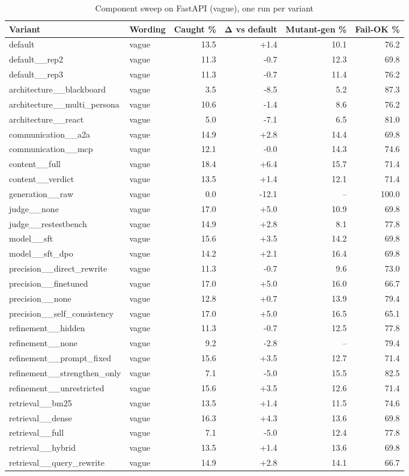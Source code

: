 \begin{table}[t]\centering\small
\caption{Component sweep on FastAPI (vague), one run per variant}
\begin{tabular}{llrrrr}
\toprule
Variant & Wording & Caught \% & Δ vs default & Mutant-gen \% & Fail-OK \% \\
\midrule
default & vague & 13.5 & +1.4 & 10.1 & 76.2 \\
default\_\_rep2 & vague & 11.3 & -0.7 & 12.3 & 69.8 \\
default\_\_rep3 & vague & 11.3 & -0.7 & 11.4 & 76.2 \\
architecture\_\_blackboard & vague & 3.5 & -8.5 & 5.2 & 87.3 \\
architecture\_\_multi\_persona & vague & 10.6 & -1.4 & 8.6 & 76.2 \\
architecture\_\_react & vague & 5.0 & -7.1 & 6.5 & 81.0 \\
communication\_\_a2a & vague & 14.9 & +2.8 & 14.4 & 69.8 \\
communication\_\_mcp & vague & 12.1 & -0.0 & 14.3 & 74.6 \\
content\_\_full & vague & 18.4 & +6.4 & 15.7 & 71.4 \\
content\_\_verdict & vague & 13.5 & +1.4 & 12.1 & 71.4 \\
generation\_\_raw & vague & 0.0 & -12.1 & – & 100.0 \\
judge\_\_none & vague & 17.0 & +5.0 & 10.9 & 69.8 \\
judge\_\_restestbench & vague & 14.9 & +2.8 & 8.1 & 77.8 \\
model\_\_sft & vague & 15.6 & +3.5 & 14.2 & 69.8 \\
model\_\_sft\_dpo & vague & 14.2 & +2.1 & 16.4 & 69.8 \\
precision\_\_direct\_rewrite & vague & 11.3 & -0.7 & 9.6 & 73.0 \\
precision\_\_finetuned & vague & 17.0 & +5.0 & 16.0 & 66.7 \\
precision\_\_none & vague & 12.8 & +0.7 & 13.9 & 79.4 \\
precision\_\_self\_consistency & vague & 17.0 & +5.0 & 16.5 & 65.1 \\
refinement\_\_hidden & vague & 11.3 & -0.7 & 12.5 & 77.8 \\
refinement\_\_none & vague & 9.2 & -2.8 & – & 79.4 \\
refinement\_\_prompt\_fixed & vague & 15.6 & +3.5 & 12.7 & 71.4 \\
refinement\_\_strengthen\_only & vague & 7.1 & -5.0 & 15.5 & 82.5 \\
refinement\_\_unrestricted & vague & 15.6 & +3.5 & 12.6 & 71.4 \\
retrieval\_\_bm25 & vague & 13.5 & +1.4 & 11.5 & 74.6 \\
retrieval\_\_dense & vague & 16.3 & +4.3 & 13.6 & 69.8 \\
retrieval\_\_full & vague & 7.1 & -5.0 & 12.4 & 77.8 \\
retrieval\_\_hybrid & vague & 13.5 & +1.4 & 13.6 & 69.8 \\
retrieval\_\_query\_rewrite & vague & 14.9 & +2.8 & 14.1 & 66.7 \\
\bottomrule
\end{tabular}
\label{tab:sweep}
\end{table}

